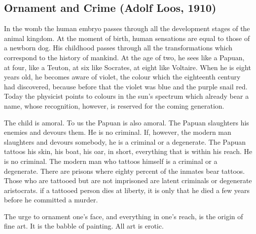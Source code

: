 \documentclass[a4paper]{article}
\begin{document}
\subsection{Ornament and Crime (Adolf Loos, 1910)}

In the womb the human embryo passes through all the development stages of the animal kingdom. At the moment of birth, human sensations are equal to those of a newborn dog. His childhood passes through all the transformations which correspond to the history of mankind. At the age of two, he sees like a Papuan, at four, like a Teuton, at six like Socrates, at eight like Voltaire. When he is eight years old, he becomes aware of violet, the colour which the eighteenth century had discovered, because before that the violet was blue and the purple snail red. Today the physicist points to colours in the sun’s spectrum which already bear a name, whose recognition, however, is reserved for the coming generation.

The child is amoral. To us the Papuan is also amoral. The Papuan slaughters his enemies and devours them. He is no criminal. If, however, the modern man slaughters and devours somebody, he is a criminal or a degenerate. The Papuan tattoos his skin, his boat, his oar, in short, everything that is within his reach. He is no criminal. The modern man who tattoos himself is a criminal or a degenerate. There are prisons where eighty percent of the inmates bear tattoos. Those who are tattooed but are not imprisoned are latent criminals or degenerate aristocrats. if a tattooed person dies at liberty, it is only that he died a few years before he committed a murder.

The urge to ornament one’s face, and everything in one’s reach, is the origin of fine art. It is the babble of painting. All art is erotic.
\end{document}
